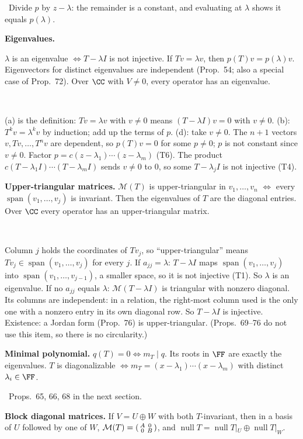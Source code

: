 \documentclass[10pt]{scrartcl}
\DeclareMathOperator{\nul}{null}
\DeclareMathOperator{\spn}{span}
\newcommand{\MM}{\mathcal M}
\newcommand{\tool}[1]{\textbf{#1}}
\newcommand{\why}[1]{\par\vspace{2pt}{\color{OliveGreen!70!black}\textbf{Why.}}\ #1\par}
\newenvironment{steps}{\begin{enumerate}[label=\arabic*.,leftmargin=1.5em,itemsep=2pt,topsep=2pt]}{\end{enumerate}}
\begin{document}
\begin{enumerate}[label=(T\arabic*),leftmargin=2.6em,itemsep=8pt]
  \why{Divide $p$ by $z-\lambda$: the remainder is a constant, and evaluating at $\lambda$ shows it equals $p(\lambda)$.}
  \ii \tool{Eigenvalues.}
  \begin{enumerate}[(a)]
    \ii $\lambda$ is an eigenvalue $\iff T-\lambda I$ is not injective.
    \ii If $Tv=\lambda v$, then $p(T)v=p(\lambda)v$.
    \ii Eigenvectors for distinct eigenvalues are independent (Prop.~54; also a special case of Prop.~72).
    \ii Over $\CC$ with $V\ne0$, every operator has an eigenvalue.
  \end{enumerate}
  \why{\begin{steps}
    \ii (a) is the definition: $Tv=\lambda v$ with $v\ne0$ means $(T-\lambda I)v=0$ with $v\ne0$.
    \ii (b): $T^kv=\lambda^kv$ by induction; add up the terms of $p$.
    \ii (d): take $v\ne0$. The $n+1$ vectors $v,Tv,\dots,T^nv$ are dependent, so $p(T)v=0$ for some $p\ne0$; $p$ is not constant since $v\ne0$.
    \ii Factor $p=c(z-\lambda_1)\cdots(z-\lambda_m)$ (T6). The product $c(T-\lambda_1I)\cdots(T-\lambda_mI)$ sends $v\ne0$ to $0$, so some $T-\lambda_jI$ is not injective (T4).
  \end{steps}}
  \ii \tool{Upper-triangular matrices.} $\MM(T)$ is upper-triangular in $v_1,\dots,v_n$ $\iff$ every $\spn(v_1,\dots,v_j)$ is invariant. Then the eigenvalues of $T$ are the diagonal entries. Over $\CC$ every operator has an upper-triangular matrix.
  \why{\begin{steps}
    \ii Column $j$ holds the coordinates of $Tv_j$, so ``upper-triangular'' means $Tv_j\in\spn(v_1,\dots,v_j)$ for every $j$.
    \ii If $a_{jj}=\lambda$: $T-\lambda I$ maps $\spn(v_1,\dots,v_j)$ into $\spn(v_1,\dots,v_{j-1})$, a smaller space, so it is not injective (T1). So $\lambda$ is an eigenvalue.
    \ii If no $a_{jj}$ equals $\lambda$: $\MM(T-\lambda I)$ is triangular with nonzero diagonal. Its columns are independent: in a relation, the right-most column used is the only one with a nonzero entry in its own diagonal row. So $T-\lambda I$ is injective.
    \ii Existence: a Jordan form (Prop.~76) is upper-triangular. (Props.~69--76 do not use this item, so there is no circularity.)
  \end{steps}}
  \ii \tool{Minimal polynomial.} $q(T)=0\iff m_T\mid q$. Its roots in $\FF$ are exactly the eigenvalues. $T$ is diagonalizable $\iff m_T=(x-\lambda_1)\cdots(x-\lambda_m)$ with distinct $\lambda_i\in\FF$.
  \why{Props.~65, 66, 68 in the next section.}
  \ii \tool{Block diagonal matrices.} If $V=U\oplus W$ with both $T$-invariant, then in a basis of $U$ followed by one of $W$, $\MM(T)=\begin{psmallmatrix}A&0\\0&B\end{psmallmatrix}$, and $\nul T=\nul T|_U\oplus\nul T|_W$.

\end{enumerate}
\end{document}
